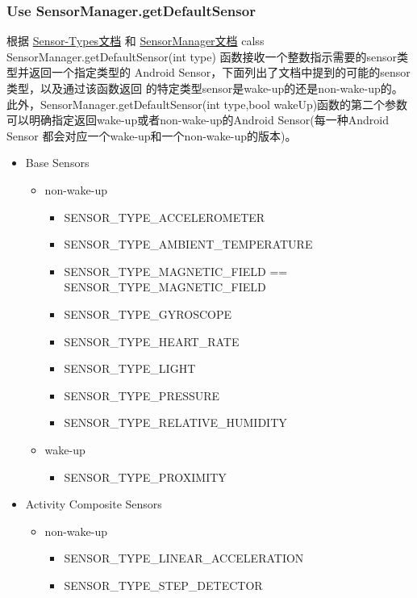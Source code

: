 
\subsubsection{Use SensorManager.getDefaultSensor}
根据
\href{https://source.android.com/devices/sensors/sensor-types.html}
     {Sensor-Types文档}
和
\href{https://developer.android.com/reference/android/hardware/SensorManager.html}{SensorManager文档}
calss SensorManager.getDefaultSensor(int type)
函数接收一个整数指示需要的sensor类型并返回一个指定类型的
Android Sensor，下面列出了文档中提到的可能的sensor类型，以及通过该函数返回
的特定类型sensor是wake-up的还是non-wake-up的。
此外，SensorManager.getDefaultSensor(int type,bool wakeUp)函数的第二个参数
可以明确指定返回wake-up或者non-wake-up的Android Sensor(每一种Android Sensor
都会对应一个wake-up和一个non-wake-up的版本)。
\begin{itemize}
  \item Base Sensors
    \begin{itemize}
    \item non-wake-up
      \begin{itemize}
        \item SENSOR\_TYPE\_ACCELEROMETER
        \item SENSOR\_TYPE\_AMBIENT\_TEMPERATURE
        \item SENSOR\_TYPE\_MAGNETIC\_FIELD == SENSOR\_TYPE\_MAGNETIC\_FIELD
        \item SENSOR\_TYPE\_GYROSCOPE
        \item SENSOR\_TYPE\_HEART\_RATE
        \item SENSOR\_TYPE\_LIGHT
        \item SENSOR\_TYPE\_PRESSURE
        \item SENSOR\_TYPE\_RELATIVE\_HUMIDITY
      \end{itemize}
    \item wake-up
      \begin{itemize}
        \item SENSOR\_TYPE\_PROXIMITY
      \end{itemize}
    \end{itemize}
  \item Activity Composite Sensors
    \begin{itemize}
    \item non-wake-up
      \begin{itemize}
      \item SENSOR\_TYPE\_LINEAR\_ACCELERATION
      \item SENSOR\_TYPE\_STEP\_DETECTOR

\end{itemize}
\end{itemize}
\end{itemize}
